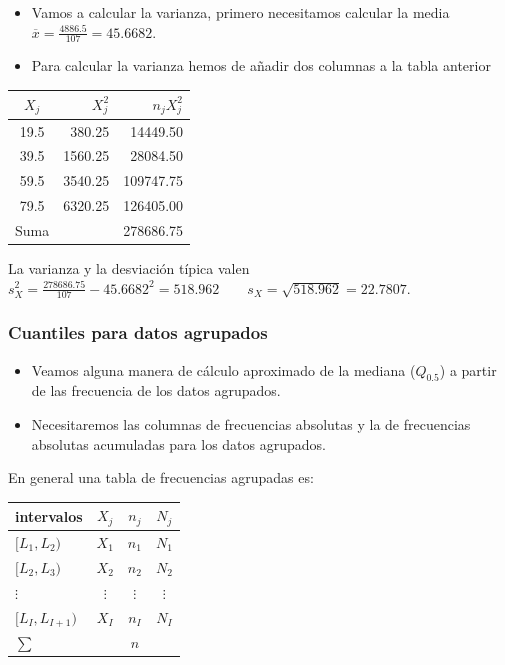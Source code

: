 \begin{frame}
\begin{itemize}
\item Vamos a calcular la varianza, primero necesitamos calcular la media $\overline{x}=\frac{4886.5}{107}=45.6682$.
\item Para calcular la varianza hemos de añadir dos columnas a la tabla anterior
\end{itemize}
\begin{center}
\begin{tabular}{crr}
 $X_j$ & $X_j^2$ & $n_jX_j^2$ \\
\hline
 19.5  & 380.25  & 14449.50 \\
 39.5  & 1560.25 &  28084.50 \\
 59.5  & 3540.25 & 109747.75 \\
 79.5  & 6320.25 & 126405.00 \\
\hline Suma   &          & 278686.75
\end{tabular}
\end{center}
 La varianza y la desviación  típica valen $s_X^2=\frac{278686.75}{107}-45.6682^2=518.962 \qquad s_X=\sqrt{518.962}=22.7807$.
\end{frame}



\begin{frame}
\frametitle{Cuantiles para datos agrupados}
\begin{itemize}
\item Veamos alguna manera de
cálculo aproximado de la mediana ($Q_{0.5}$) a partir de las frecuencia de los datos agrupados.
\item Necesitaremos las columnas de frecuencias absolutas y la de frecuencias absolutas
acumuladas para los datos agrupados.
\end{itemize}

\end{frame}

\begin{frame}
En general una tabla de frecuencias agrupadas es:

\begin{center}
\begin{tabular}{l|ccc|}
intervalos & $X_j$ & $n_j$ &$ N_j$ \\ \hline \hline $[L_1, L_2)$ & $X_1$ & $n_1$ & $N_1$
\\ $[L_2, L_3)$ & $X_2$ & $n_2$ & $N_2$ \\ \hline $\vdots$ & $\vdots$ & $\vdots$ &
$\vdots$ \\ \hline $[L_I, L_{I+1})$ & $X_I$ & $n_I$ & $N_I$ \\ \hline $\sum$ & & $n$ &
\end{tabular}
\end{center}
\end{frame}

